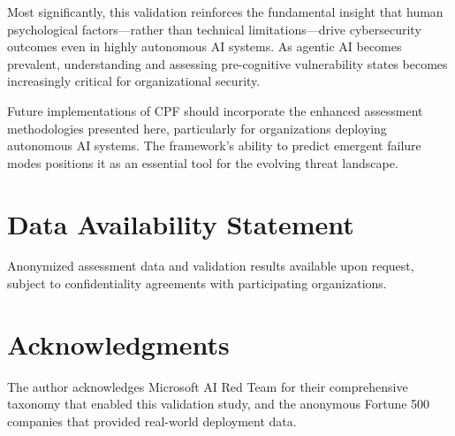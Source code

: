 \documentclass[11pt,a4paper]{article}
\begin{document}
Most significantly, this validation reinforces the fundamental insight that human psychological factors—rather than technical limitations—drive cybersecurity outcomes even in highly autonomous AI systems. As agentic AI becomes prevalent, understanding and assessing pre-cognitive vulnerability states becomes increasingly critical for organizational security.

Future implementations of CPF should incorporate the enhanced assessment methodologies presented here, particularly for organizations deploying autonomous AI systems. The framework's ability to predict emergent failure modes positions it as an essential tool for the evolving threat landscape.

\section*{Data Availability Statement}

Anonymized assessment data and validation results available upon request, subject to confidentiality agreements with participating organizations.

\section*{Acknowledgments}

The author acknowledges Microsoft AI Red Team for their comprehensive taxonomy that enabled this validation study, and the anonymous Fortune 500 companies that provided real-world deployment data.
\end{document}
